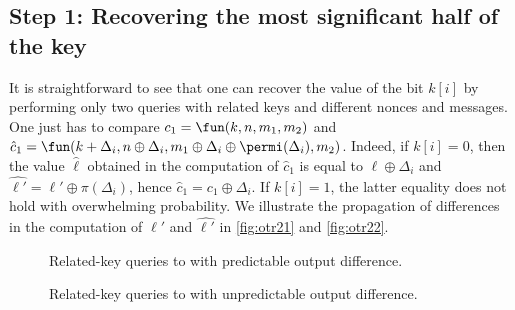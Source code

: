 \subsection{Step 1: Recovering the most significant half of the key}

It is straightforward to see that one can recover the value
of the bit $k[i]$ by performing only two queries with related keys
and different nonces and messages. One just has to compare
$c_1 = \fun(k, n, m_1, m_2)$ and
$\hat{c}_1 = \fun(k + \Delta_i,n \oplus \Delta_i,
m_1 \oplus \Delta_i \oplus \permi(\Delta_i), m_2)$. Indeed, if $k[i] = 0$,
then the value $\hat{\ell}$ obtained in the computation of $\hat{c}_1$ is equal to
$\ell \oplus \Delta_i$ and $\hat{\ell'} = \ell' \oplus \pi(\Delta_i)$, hence
$\hat{c}_1 = c_1 \oplus \Delta_i$. If $k[i] = 1$, the latter equality does not
hold with overwhelming probability.
We illustrate the propagation of differences in the computation of $\ell'$ and $\hat{\ell'}$ in
\autoref{fig:otr21} and \autoref{fig:otr22}.


\begin{figure}[!htb]
\begin{center}

\caption{Related-key queries to \proestotr with predictable output difference.\label{fig:otr21}}
\end{center}
\end{figure}

\begin{figure}[!htb]
\begin{center}

\caption{Related-key queries to \proestotr with unpredictable output difference.\label{fig:otr22}}
\end{center}
\end{figure}

